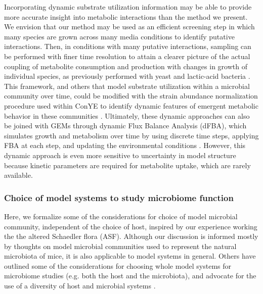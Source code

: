 \documentclass[11pt,twocolumn,notitlepage,openany,twoside]{book}
\begin{document}
\begin{refsection}
Incorporating dynamic substrate utilization information may be able to provide more accurate insight into metabolic interactions than the method we present. We envision that our method may be used as an efficient screening step in which many species are grown across many media conditions to identify putative interactions. Then, in conditions with many putative interactions, sampling can be performed with finer time resolution to attain a clearer picture of the actual coupling of metabolite consumption and production with changes in growth of individual species, as previously performed with yeast and lactic-acid bacteria \cite{Ponomarova2017-ob}. This framework, and others that model substrate utilization within a microbial community over time, could be modified with the strain abundance normalization procedure used within ConYE to identify dynamic features of emergent metabolic behavior in these communities \cite{Erbilgin2017-la}. Ultimately, these dynamic approaches can also be joined with GEMs through dynamic Flux Balance Analysis (dFBA), which simulates growth and metabolism over time by using discrete time steps, applying FBA at each step, and updating the environmental conditions \cite{Harcombe2014-ev}. However, this dynamic approach is even more sensitive to uncertainty in model structure because kinetic parameters are required for metabolite uptake, which are rarely available.

\subsubsection{Choice of model systems to study microbiome function}
Here, we formalize some of the considerations for choice of model microbial community, independent of the choice of host, inspired by our experience working the the altered Schaedler flora (ASF). Although our discussion is informed mostly by thoughts on model microbial communities used to represent the natural microbiota of mice, it is also applicable to model systems in general. Others have outlined some of the considerations for choosing whole model systems for microbiome studies (e.g. both the host and the microbiota), and advocate for the use of a diversity of host and microbial systems \cite{Douglas2018-oj}.


\end{refsection}
\end{document}
